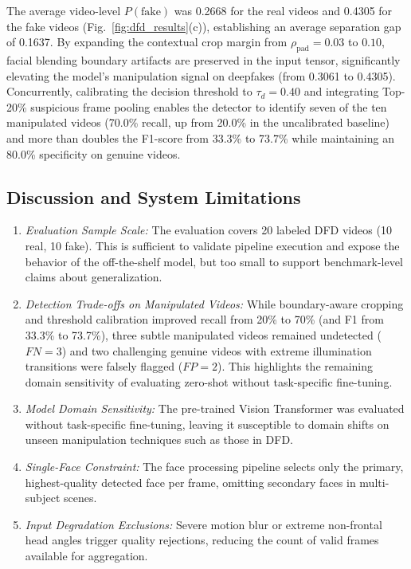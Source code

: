 \documentclass[conference]{IEEEtran}
\begin{document}
The average video-level $P(\text{fake})$ was 0.2668 for the real videos and 0.4305 for the fake videos (Fig.~\ref{fig:dfd_results}(c)), establishing an average separation gap of 0.1637. By expanding the contextual crop margin from $\rho_{\text{pad}} = 0.03$ to $0.10$, facial blending boundary artifacts are preserved in the input tensor, significantly elevating the model's manipulation signal on deepfakes (from 0.3061 to 0.4305). Concurrently, calibrating the decision threshold to $\tau_d = 0.40$ and integrating Top-20\% suspicious frame pooling enables the detector to identify seven of the ten manipulated videos (70.0\% recall, up from 20.0\% in the uncalibrated baseline) and more than doubles the F1-score from 33.3\% to 73.7\% while maintaining an 80.0\% specificity on genuine videos.

\subsection{Discussion and System Limitations}
\begin{enumerate}
\item \textit{Evaluation Sample Scale:} The evaluation covers 20 labeled DFD videos (10 real, 10 fake). This is sufficient to validate pipeline execution and expose the behavior of the off-the-shelf model, but too small to support benchmark-level claims about generalization.
\item \textit{Detection Trade-offs on Manipulated Videos:} While boundary-aware cropping and threshold calibration improved recall from 20\% to 70\% (and F1 from 33.3\% to 73.7\%), three subtle manipulated videos remained undetected ($FN=3$) and two challenging genuine videos with extreme illumination transitions were falsely flagged ($FP=2$). This highlights the remaining domain sensitivity of evaluating zero-shot without task-specific fine-tuning.
\item \textit{Model Domain Sensitivity:} The pre-trained Vision Transformer was evaluated without task-specific fine-tuning, leaving it susceptible to domain shifts on unseen manipulation techniques such as those in DFD.
\item \textit{Single-Face Constraint:} The face processing pipeline selects only the primary, highest-quality detected face per frame, omitting secondary faces in multi-subject scenes.
\item \textit{Input Degradation Exclusions:} Severe motion blur or extreme non-frontal head angles trigger quality rejections, reducing the count of valid frames available for aggregation.
\end{enumerate}
\end{document}
